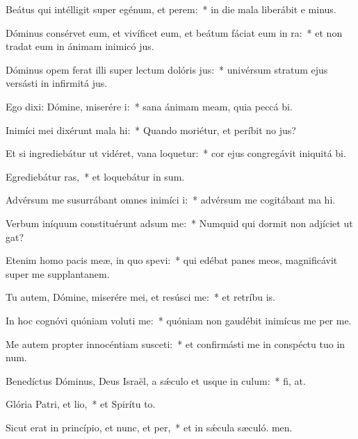 \item Beátus qui intélligit super egénum, et perem:~* in die mala liberábit e minus.
\item Dóminus consérvet eum, et vivíficet eum, et beátum fáciat eum in ra:~* et non tradat eum in ánimam inimicó jus.
\item Dóminus opem ferat illi super lectum dolóris jus:~* univérsum stratum ejus versásti in infirmitá jus.
\item Ego dixi: Dómine, miserére i:~* sana ánimam meam, quia peccá bi.
\item Inimíci mei dixérunt mala hi:~* Quando moriétur, et períbit no jus?
\item Et si ingrediebátur ut vidéret, vana loquetur:~* cor ejus congregávit iniquitá bi.
\item Egrediebátur ras,~* et loquebátur in sum.
\item Advérsum me susurrábant omnes inimíci i:~* advérsum me cogitábant ma hi.
\item Verbum iníquum constituérunt adsum me:~* Numquid qui dormit non adjíciet ut gat?
\item Etenim homo pacis meæ, in quo spevi:~* qui edébat panes meos, magnificávit super me supplantanem.
\item Tu autem, Dómine, miserére mei, et resúsci me:~* et retríbu is.
\item In hoc cognóvi quóniam voluti me:~* quóniam non gaudébit inimícus me per me.
\item Me autem propter innocéntiam susceti:~* et confirmásti me in conspéctu tuo in num.
\item Benedíctus Dóminus, Deus Israël, a sǽculo et usque in culum:~* fi, at.
\item Glória Patri, et lio,~* et Spirítu to.
\item Sicut erat in princípio, et nunc, et per,~* et in sǽcula sæculó. men.
